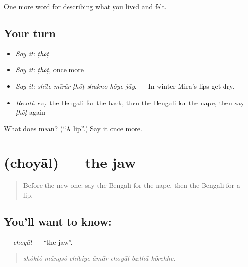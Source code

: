 \begin{grammarlens}[title={What you've built}]
One more word for describing what you lived and felt.
\end{grammarlens}

\subsection*{Your turn}
\begin{itemize}
\raggedright
  \item \emph{Say it:} \emph{ṭhõṭ}
  \item \emph{Say it:} \emph{ṭhõṭ}, once more
  \item \emph{Say it:} \emph{shīte mīrār ṭhõṭ shukno hôye jāy.} — In winter Mira's lips get dry.
  \item \emph{Recall:} say the Bengali for the back, then the Bengali for the nape, then say \emph{ṭhõṭ} again
\end{itemize}

\begin{tcolorbox}[breakable,colback=teal!4,colframe=teal!35!black,title={Before you move on}]
What does  mean? (\textquotedblleft{}A lip\textquotedblright{}.) Say it once more.
\end{tcolorbox}
\section[\texorpdfstring{\bn{চোয়াল} (choyāl)}{চোয়াল (choyāl)}]{ (choyāl) — the jaw}

\label{lesson:BN-C467-choyal}



\begin{quote}
Before the new one: say the Bengali for the nape, then the Bengali for a lip.
\end{quote}

\subsection*{You'll want to know: }
\textbf{} — \emph{choyāl} — \textquotedblleft{}the jaw\textquotedblright{}.

\begin{quote}
      
\end{quote}

\begin{quote}
\emph{shôktô māngsô chibiye āmār choyāl bæthā kôrchhe.}
\end{quote}

